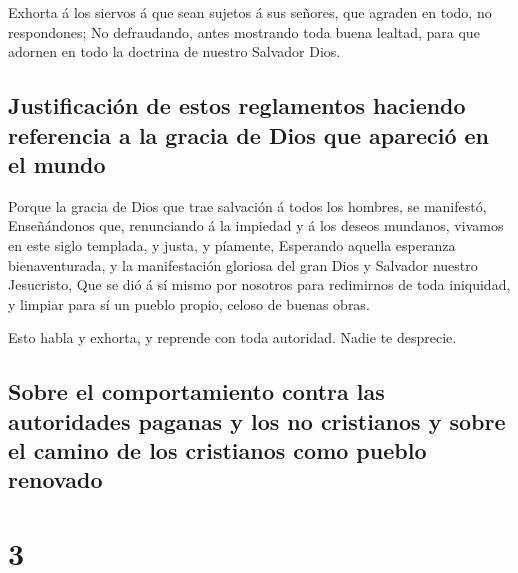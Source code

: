  Exhorta á los siervos á que sean sujetos á sus señores,
que agraden en todo, no respondones;  No defraudando,
antes mostrando toda buena lealtad, para que adornen en todo la doctrina
de nuestro Salvador Dios.

\hypertarget{justificaciuxf3n-de-estos-reglamentos-haciendo-referencia-a-la-gracia-de-dios-que-apareciuxf3-en-el-mundo}{%
\subsection{Justificación de estos reglamentos haciendo referencia a la
gracia de Dios que apareció en el
mundo}\label{justificaciuxf3n-de-estos-reglamentos-haciendo-referencia-a-la-gracia-de-dios-que-apareciuxf3-en-el-mundo}}

 Porque la gracia de Dios que trae salvación á todos los
hombres, se manifestó,  Enseñándonos que, renunciando á
la impiedad y á los deseos mundanos, vivamos en este siglo templada, y
justa, y píamente,  Esperando aquella esperanza
bienaventurada, y la manifestación gloriosa del gran Dios y Salvador
nuestro Jesucristo,  Que se dió á sí mismo por nosotros
para redimirnos de toda iniquidad, y limpiar para sí un pueblo propio,
celoso de buenas obras.

 Esto habla y exhorta, y reprende con toda autoridad.
Nadie te desprecie.

\hypertarget{sobre-el-comportamiento-contra-las-autoridades-paganas-y-los-no-cristianos-y-sobre-el-camino-de-los-cristianos-como-pueblo-renovado}{%
\subsection{Sobre el comportamiento contra las autoridades paganas y los
no cristianos y sobre el camino de los cristianos como pueblo
renovado}\label{sobre-el-comportamiento-contra-las-autoridades-paganas-y-los-no-cristianos-y-sobre-el-camino-de-los-cristianos-como-pueblo-renovado}}

\hypertarget{section-56-3}{%
\section{3}\label{section-56-3}}

